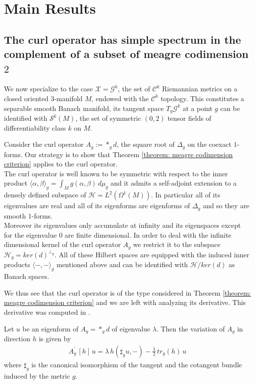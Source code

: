 \section{Main Results}
\label{section:main result}

\subsection{The curl operator has simple spectrum in the complement of a subset of meagre codimension $2$}
\label{subsection: the coclosed spectrum being simple is a meagre codimension 2 property}
We now specialize to the case $\mathcal{X}=\mathcal{G}^k$, the set of $\mathcal{C}^k$ Riemannian metrics on a closed oriented $3$-manifold $M$, endowed with the $\mathcal{C}^k$ topology. This constitutes a separable smooth Banach manifold, its tangent space $T_g \mathcal{G}^k$ at a point $g$ can be identified with $\mathcal{S}^k(M)$, the set of symmetric $(0,2)$ tensor fields of differentiability class $k$ on $M$.\par
Consider the curl operator $A_g:=\ast_g d$, the square root of $\Delta_g$ on the coexact $1$-forms. Our strategy is to show that Theorem \ref{theorem: meagre codimension criterion} applies to the curl operator.\\
The curl operator is well known to be symmetric with respect to the inner product $\langle \alpha,\beta\rangle_g=\int_M g(\alpha,\beta)\, d\mu_g$ and it admits a self-adjoint extension to a densely defined subspace of $\mathcal{H}=L^2(\Omega^1(M))$. In particular all of its eigenvalues are real and all of its eigenforms are eigenforms of $\Delta_g$ and so they are smooth $1$-forms.\\
Moreover its eigenvalues only accumulate at infinity and its eigenspaces except for the eigenvalue $0$ are finite dimensional. In order to deal with the infinite dimensional kernel of the curl operator $A_g$ we restrict it to the subspace $\mathcal{H}_g=ker(d)^{\perp_g}$. All of these Hilbert spaces are equipped with the induced inner products $\langle-,-\rangle_g$ mentioned above and can be identified with $\mathcal{H}/ker(d)$ as Banach spaces.\par
We thus see that the curl operator is of the type considered in Theorem \ref{theorem: meagre codimension criterion} and we are left with analyzing its derivative. This derivative was computed in \cite{Enciso2012}.

\begin{lem}{\cite[Lemma 2.1.]{Enciso2012}}
    Let $u$ be an eigenform of $A_g=\ast_g d$ of eigenvalue $\lambda$. Then the variation of $A_g$ in direction $h$ is given by 
    \begin{align*}
        A^\prime_g\,[h]\,u=\lambda\,h(\sharp_{g} u, -)-\frac{\lambda}{2}\,tr_g (h)\,u
    \end{align*}
where $\sharp_g$ is the canonical isomorphism of the tangent and the cotangent bundle induced by the metric $g$.
\end{lem}

